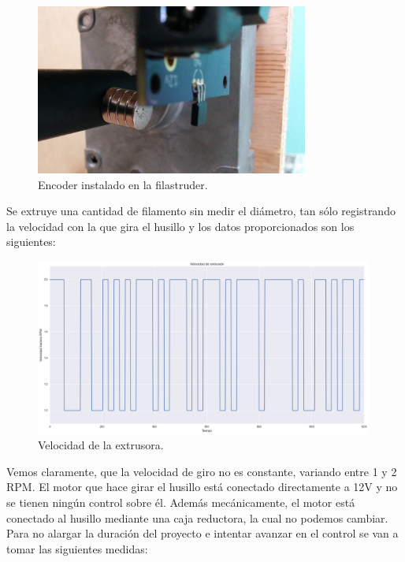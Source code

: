 \begin{figure}[H]
    \centering
    \includegraphics[width=0.8\textwidth]{images/producciones/20072015/IMG_20150721_110502.jpg}
    \caption{Encoder instalado en la filastruder.}
    \label{fig:2007105-enc}
\end{figure}

Se extruye una cantidad de filamento sin medir el diámetro, tan sólo registrando la velocidad con la que gira el husillo y los datos proporcionados son los siguientes:

\begin{figure}[H]
    \centering
    \includegraphics[width=0.99\textwidth]{images/producciones/20072015/RPM_tract.png}
    \caption{Velocidad de la extrusora.}
    \label{fig:2007105-grafenc}
\end{figure}

Vemos claramente, que la velocidad de giro no es constante, variando entre 1 y 2 RPM. El motor que hace girar el husillo está conectado directamente a 12V y no se tienen ningún control sobre él. Además mecánicamente, el motor está conectado al husillo mediante una caja reductora, la cual no podemos cambiar. Para no alargar la duración del proyecto e intentar avanzar en el control se van a tomar las siguientes medidas:

